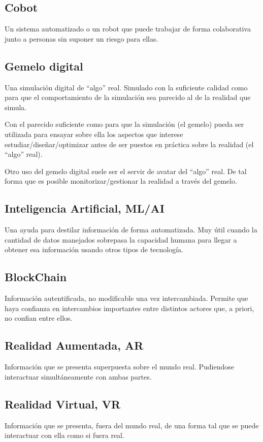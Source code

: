 \documentclass[spanish,12pt,a4paper,final,oneside]{book}
\begin{document}
\subsection*{Cobot}
Un sistema automatizado o un robot que puede trabajar de forma colaborativa junto a personas sin suponer un riesgo para ellas.

\subsection*{Gemelo digital}
Una simulación digital de ``algo'' real. Simulado con la suficiente calidad como para que el comportamiento de la simulación sea parecido al de la realidad que simula. 

Con el parecido suficiente como para que la simulación (el gemelo) pueda ser utilizada para ensayar sobre ella los aspectos que interese estudiar/diseñar/optimizar antes de ser puestos en práctica sobre la realidad (el ``algo'' real).

Otro uso del gemelo digital suele ser el servir de avatar del ``algo'' real. De tal forma que es posible monitorizar/gestionar la realidad a través del gemelo.

\subsection*{Inteligencia Artificial, ML/AI}
Una ayuda para destilar información de forma automatizada. Muy útil cuando la cantidad de datos manejados sobrepasa la capacidad humana para llegar a obtener esa información usando otros tipos de tecnología.

\subsection*{BlockChain}
Información autentificada, no modificable una vez intercambiada. Permite que haya confianza en intercambios importantes entre distintos actores que, a priori, no confian entre ellos.

\subsection*{Realidad Aumentada, AR}
Información que se presenta superpuesta sobre el mundo real. Pudiendose interactuar simultáneamente con ambas partes.

\subsection*{Realidad Virtual, VR}
Información que se presenta, fuera del mundo real, de una forma tal que se puede interactuar con ella como si fuera real.
\end{document}
